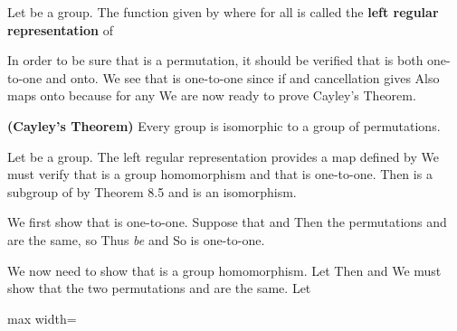\documentclass[11pt,oneside]{article}
\begin{document}
\begin{BookBody}
 Let  be a group. The function  given by  where  for all  is called the\textbf{ left regular representation} of \BookEnd{\blacksquare}

\noindent In order to be sure that  is a permutation, it should be verified that  is both one-to-one and onto. We see that  is one-to-one since if  and cancellation gives  Also maps onto  because for any  We are now ready to prove Cayley’s Theorem.

 \textbf{(Cayley’s Theorem)} Every group is isomorphic to a group of permutations.

 Let  be a group. The left regular representation provides a map  defined by  We must verify that \BookInline{\phi } is a group homomorphism and that \BookInline{\phi } is one-to-one. Then \BookInline{\phi [G]} is a subgroup of  by Theorem 8.5 and  is an isomorphism.

We first show that \BookInline{\phi } is one-to-one. Suppose that  and  Then the permutations  and  are the same, so  Thus  \textit{be} and  So \BookInline{\phi } is one-to-one.

We now need to show that \BookInline{\phi } is a group homomorphism. Let  Then   and  We must show that the two permutations  and  are the same. Let 

\begin{center}\begin{adjustbox}{max width=\linewidth}\end{adjustbox}\end{center}


\end{BookBody}
\end{document}

